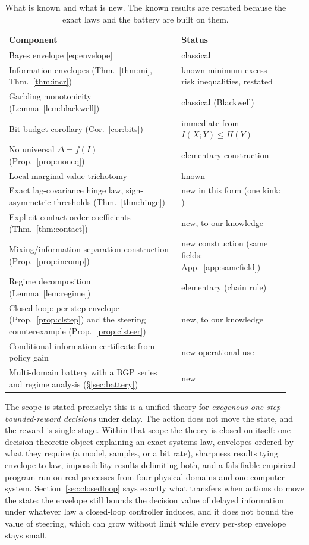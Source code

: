 \documentclass[acmsmall,screen,review,anonymous]{acmart}
\begin{document}
\begin{table}[!ht]\centering\small
\begin{tabular}{p{0.58\linewidth}p{0.36\linewidth}}
\toprule
Component & Status \\
\midrule
Bayes envelope \eqref{eq:envelope} & classical \cite{howard1966,raiffa61,delaragossner} \\
Information envelopes (Thm.~\ref{thm:mi}, Thm.~\ref{thm:incr}) & known minimum-excess-risk inequalities, restated \\
Garbling monotonicity (Lemma~\ref{lem:blackwell}) & classical (Blackwell) \\
Bit-budget corollary (Cor.~\ref{cor:bits}) & immediate from $I(X;Y)\le H(Y)$ \\
No universal $\Delta=f(I)$ (Prop.~\ref{prop:noneq}) & elementary construction \\
Local marginal-value trichotomy & known \cite{delaragossner} \\
Exact lag-covariance hinge law, sign-asymmetric thresholds (Thm.~\ref{thm:hinge}) & new in this form (one kink: \cite{murphy77}) \\
Explicit contact-order coefficients (Thm.~\ref{thm:contact}) & new, to our knowledge \\
Mixing/information separation construction (Prop.~\ref{prop:incomp}) & new construction (same fields: App.~\ref{app:samefield}) \\
Regime decomposition (Lemma~\ref{lem:regime}) & elementary (chain rule) \\
Closed loop: per-step envelope (Prop.~\ref{prop:clstep}) and the steering
counterexample (Prop.~\ref{prop:clsteer}) & new, to our knowledge \\
Conditional-information certificate from policy gain & new operational use \\
Multi-domain battery with a BGP series and regime analysis (\S\ref{sec:battery}) & new \\
\bottomrule
\end{tabular}
\caption{What is known and what is new. The known results are restated because the exact laws and the battery are built on them.}
\label{tab:novelty}
\end{table}

The scope is stated precisely: this is a unified theory for
\emph{exogenous one-step bounded-reward decisions} under delay. The
action does not move the state, and the reward is single-stage. Within that
scope the theory is closed on itself: one decision-theoretic object
explaining an exact systems law, envelopes ordered by what they require
(a model, samples, or a bit rate), sharpness results tying envelope to law,
impossibility results delimiting both, and a falsifiable empirical program
run on real processes from four physical domains and one computer system.
Section~\ref{sec:closedloop} says exactly what transfers when actions do move
the state: the envelope still bounds the decision value of delayed
information under whatever law a closed-loop controller induces, and it
does not bound the value of steering, which can grow without limit while
every per-step envelope stays small.
\end{document}
